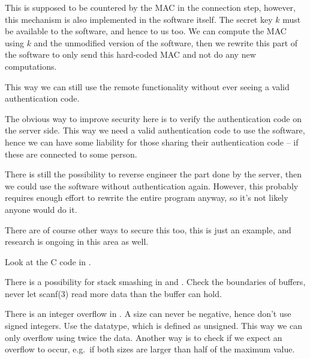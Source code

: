 \documentclass[svv,addpoints]{miunexam}
\begin{document}
\begin{questions}
\begin{solution}
    This is supposed to be countered by the MAC in the connection step, 
    however, this mechanism is also implemented in the software itself.
    The secret key \(k\) must be available to the software, and hence to us 
    too.
    We can compute the MAC using \(k\) and the unmodified version of the 
    software, then we rewrite this part of the software to only send this 
    hard-coded MAC and not do any new computations.

    This way we can still use the remote functionality without ever seeing 
    a valid authentication code.

    The obvious way to improve security here is to verify the authentication 
    code on the server side.
    This way we need a valid authentication code to use the software, hence we 
    can have some liability for those sharing their authentication code -- if 
    these are connected to some person.

    There is still the possibility to reverse engineer the part done by the 
    server, then we could use the software without authentication again.
    However, this probably requires enough effort to rewrite the entire program 
    anyway, so it's not likely anyone would do it.

    There are of course other ways to secure this too, this is just an example, 
    and research is ongoing in this area as well.
  \end{solution}


  \question\label{q:stacksmash}
  Look at the C code in .
  \begin{solution}
    There is a possibility for stack smashing in  and 
    .
    Check the boundaries of buffers, never let scanf(3) read more data than the 
    buffer can hold.

    There is an integer overflow in .
    A size can never be negative, hence don't use signed integers.
    Use the  datatype, which is defined as unsigned.
    This way we can only overflow using twice the data.
    Another way is to check if we expect an overflow to occur, e.g.\ if both 
    sizes are larger than half of the maximum value.
  \end{solution}


\end{questions}
\end{document}
